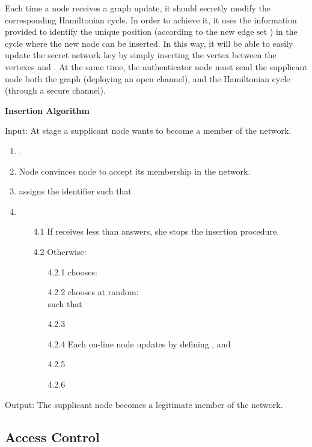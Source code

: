 \documentclass{article}
\begin{document}
Each time a node receives a graph update, it should secretly modify the corresponding Hamiltonian cycle. In order to achieve it, it uses the information provided to identify the unique position (according to the new edge set ) in the cycle where the new node can be inserted. In this way, it will be able to easily update the secret network key by simply inserting the vertex  between the vertexes  and . At the same time, the
authenticator node  must send the supplicant node  both the graph  (deploying an open channel), and  the Hamiltonian cycle  (through a secure channel).

{\bf Insertion Algorithm}

Input: At stage  a supplicant node  wants to become a member
of the network.
\begin{enumerate}
	\item .
	\item Node  convinces node  to accept its membership in the network.
  \item   assigns  the identifier  such that 
  \item  
  \begin {itemize}
      \item [4.1] If  receives less than  answers, she stops the insertion procedure.
      \item [4.2]Otherwise:
      \begin{itemize}
            \item [4.2.1] chooses:\\
            
            \item [4.2.2] chooses at random:\\
              such that
            
            \item [4.2.3] 
            \item [4.2.4]Each on-line node updates  by defining ,  and
     				
    				\item [4.2.5] 
    				\item [4.2.6] 
    	\end{itemize}
  \end{itemize}
\end {enumerate}

Output:  The supplicant node  becomes a legitimate member of the
network.

\subsection{Access Control}
\label{Sub:AcCont}
\end{document}
